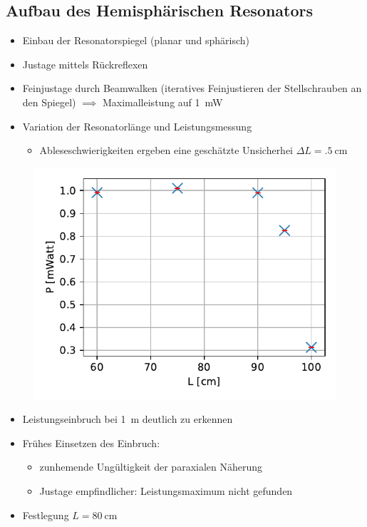\documentclass[10pt, aspectratio=169]{beamer}
\begin{document}
\subsection{Aufbau des Hemisph\"arischen Resonators}
\begin{frame}
  \begin{itemize}
  \item<1-> Einbau der Resonatorspiegel (planar und sph\"arisch)
  \item<2-> Justage mittels R\"uckreflexen
  \item<3-> Feinjustage durch Beamwalken (iteratives Feinjustieren der
    Stellschrauben an den Spiegel) \(\implies\) Maximalleistung auf
    \SI{1}{\milli\watt}
  \item<4-> Variation der Resonatorl\"ange und Leistungsmessung
    \begin{itemize}
    \item Ableseschwierigkeiten ergeben eine gesch\"atzte Unsicherhei
      \(\Delta L = \SI{.5}{\centi\meter}\)
    \end{itemize}
  \end{itemize}

\end{frame}

\begin{frame}
  \begin{figure}[H]\centering
    \includegraphics[width=.5\columnwidth]{figs/power-over-l.pdf}
  \end{figure}
  \begin{itemize}
  \item<1-> Leistungseinbruch bei \SI{1}{\meter} deutlich zu erkennen
  \item<2-> Fr\"uhes Einsetzen des Einbruch:
    \begin{itemize}
    \item zunhemende Ung\"ultigkeit der paraxialen N\"aherung
    \item Justage empfindlicher: Leistungsmaximum nicht gefunden
    \end{itemize}
  \item<3-> Festlegung \(L=\SI{80}{\centi\meter}\)
  \end{itemize}
\end{frame}
\end{document}

